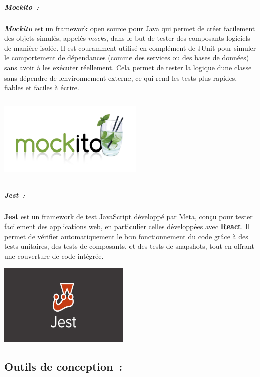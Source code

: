 \documentclass[12pt,a4paper,twoside,openright]{report}
\begin{document}
\hypertarget{mockito}{%
\subparagraph{Mockito~:}\label{mockito}}

\emph{\textbf{Mockito}} est un framework open source pour Java qui
permet de créer facilement des objets simulés, appelés \emph{mocks},
dans le but de tester des composants logiciels de manière isolée. Il est
couramment utilisé en complément de JUnit pour simuler le comportement
de dépendances (comme des services ou des bases de données) sans avoir à
les exécuter réellement. Cela permet de tester la logique
d\textquotesingle une classe sans dépendre de
l\textquotesingle environnement externe, ce qui rend les tests plus
rapides, fiables et faciles à écrire.

\includegraphics[width=2.72569in,height=1.62222in]{latex_media/media/image35.png}

\hypertarget{jest}{%
\subparagraph{Jest~:}\label{jest}}

\textbf{Jest} est un framework de test JavaScript développé par Meta,
conçu pour tester facilement des applications web, en particulier celles
développées avec \textbf{React}. Il permet de vérifier automatiquement
le bon fonctionnement du code grâce à des tests unitaires, des tests de
composants, et des tests de snapshots, tout en offrant une couverture de
code intégrée.

\includegraphics[width=2.47569in,height=1.53542in]{latex_media/media/image36.png}

\hypertarget{outils-de-conception}{%
\subsection{Outils de conception~:}\label{outils-de-conception}}
\end{document}
